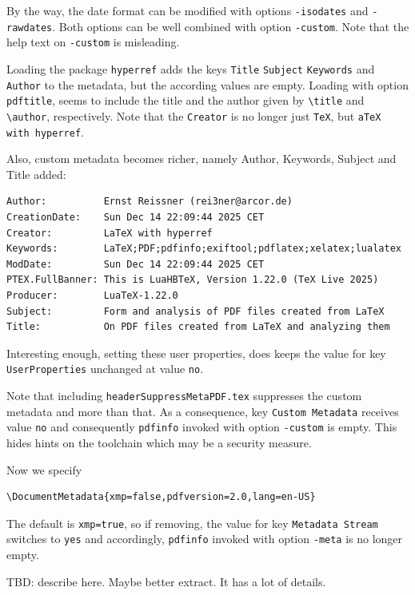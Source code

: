 \documentclass[a4paper, USenglish]{article}%
\makeatletter
\newcommand{\cmd}[2][]{\texttt{\textbackslash{}#2#1}}
\newcommand{\pkg}[1]{\texttt{#1}}%
\newcommand{\cmd}[2][]{\texttt{\textbackslash{}#2#1}\sindex[cmd]{#2@\texttt{\textbackslash{}#2}}}%
\newcommand{\pkg}[2][]{\texorpdfstring{\texttt{#2}\sindex[pkg]{#2@\texttt{#2}}}{xxx}} %
\makeatother
\begin{document}
By the way, the date format can be modified with options \texttt{-isodates} and \texttt{-rawdates}. 
Both options can be well combined with option \texttt{-custom}. 
Note that the help text on \texttt{-custom} is misleading. 

Loading the package \pkg{hyperref} 
adds the keys \texttt{Title} \texttt{Subject} \texttt{Keywords}  and \texttt{Author} to the metadata, 
but the according values are empty. 
Loading with option \texttt{pdftitle}, seems to include the title and the author given by \cmd{title} and \cmd{author}, respectively. 
Note that the \texttt{Creator} is no longer just \texttt{TeX}, but \texttt{aTeX with hyperref}. 

Also, custom metadata becomes richer, namely Author, Keywords, Subject and Title added: 
%
\begin{verbatim}
Author:          Ernst Reissner (rei3ner@arcor.de)
CreationDate:    Sun Dec 14 22:09:44 2025 CET
Creator:         LaTeX with hyperref
Keywords:        LaTeX;PDF;pdfinfo;exiftool;pdflatex;xelatex;lualatex
ModDate:         Sun Dec 14 22:09:44 2025 CET
PTEX.FullBanner: This is LuaHBTeX, Version 1.22.0 (TeX Live 2025)
Producer:        LuaTeX-1.22.0
Subject:         Form and analysis of PDF files created from LaTeX
Title:           On PDF files created from LaTeX and analyzing them 
\end{verbatim}
%
Interesting enough, setting these user properties, 
does keeps the value for key \texttt{UserProperties} unchanged at value \texttt{no}. 

Note that including \texttt{headerSuppressMetaPDF.tex} suppresses the custom metadata and more than that. 
As a consequence, key \texttt{Custom Metadata} receives value \texttt{no} and consequently 
\texttt{pdfinfo} invoked with option \texttt{-custom} is empty. 
This hides hints on the toolchain which may be a security measure. 

Now we specify 
%
\begin{verbatim}
\DocumentMetadata{xmp=false,pdfversion=2.0,lang=en-US}
\end{verbatim}
%

The default is \texttt{xmp=true}, so if removing, the value for key \texttt{Metadata Stream} switches to \texttt{yes} 
and accordingly, \texttt{pdfinfo} invoked with option \texttt{-meta} is no longer empty. 

TBD: describe here. Maybe better extract. It has a lot of details. 
\end{document}
